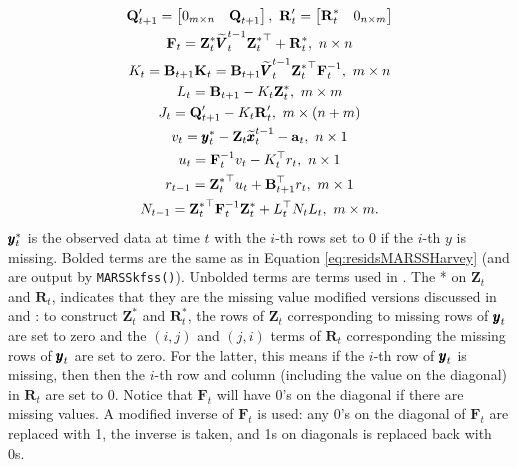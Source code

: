 \documentclass[]{article}
\def\UPS{\mbox{\boldmath $\Upsilon$}}
\def\XI{\mbox{\boldmath $\Xi$}}
\def\BB{\mbox{$\mathbf B$}}	\def\bb{\mbox{$\mathbf b$}} \def\Bb{\mbox{$\mathbf J$}} \def\Ba{\mbox{$\mathbf L$}} \def\Bm{\UPS}
\def\FF{\mbox{$\mathbf F$}} \def\ff{\mbox{$\mathbf f$}}
\def\KK{\mbox{$\mathbf K$}}
\def\QQ{\mbox{$\mathbf Q$}}	 \def\qq{\mbox{$\mathbf q$}} \def\Qb{\mbox{$\mathbf G$}}  \def\Qm{\mathbb{Q}}
\def\RR{\mbox{$\mathbf R$}}	 \def\rr{\mbox{$\mathbf r$}} \def\Rb{\mbox{$\mathbf H$}}	\def\Rm{\mathbb{R}}
\def\VV{\mbox{$\pmb{V}$}}	\def\vv{\mbox{$\pmb{v}$}}
\def\ZZ{\mbox{$\mathbf Z$}}	\def\zz{\mbox{$\mathbf z$}}	\def\Zb{\mbox{$\mathbf M$}} \def\Za{\mbox{$\mathbf N$}} \def\Zm{\XI}
\def\hatxttm{\widetilde{\xx}_t^{t-1}}
\def\hatVttm{\widetilde{\VV}_t^{t-1}}
\begin{document}
\begin{equation}\label{eq:Harveyalgo}
\begin{gathered}
\QQ^\prime_{t+1}=\begin{bmatrix}0_{m \times n}&\QQ_{t+1}\end{bmatrix}, \mbox{    } \RR^\prime_t=\begin{bmatrix}\RR_t^* & 0_{n \times m}\end{bmatrix}\\
\FF_t = \ZZ_t^*\hatVttm{\ZZ_t^*}^\top+\RR_t^* , \,\, n \times n \\
K_t = \BB_{t+1}\KK_t = \BB_{t+1} \hatVttm{\ZZ_t^*}^\top \FF_t^{-1}  , \,\, m \times n  \\
L_t = \BB_{t+1} - K_t\ZZ_t^*  , \,\, m \times m \\
J_t= \QQ^\prime_{t+1} - K_t \RR^\prime_t  , \,\, m \times (n+m) \\
v_t = \yy_t^* - \ZZ_t\hatxttm - \aa_t , \,\, n \times 1 \\
u_t = \FF_t^{-1} v_t - K_t^\top r_t , \,\, n \times 1 \\
r_{t-1} = {\ZZ_t^*}^\top u_t + \BB_{t+1}^\top r_t , \,\, m \times 1  \\
N_{t-1} = {\ZZ_t^*}^\top \FF_t^{-1} \ZZ_t^* + L_t^\top N_t L_t   , \,\, m \times m .
\end{gathered}
\end{equation}
$\mbox{$\pmb{y}$}_t^*$ is the observed data at time $t$ with the $i$-th rows set to 0 if the $i$-th $y$ is missing. 
Bolded terms are the same as in Equation \ref{eq:residsMARSSHarvey} (and are output by \texttt{MARSSkfss()}).  Unbolded terms are terms used in \citet{Harveyetal1998}.  The * on $\ZZ_t$ and $\RR_t$, indicates that they are the missing value modified versions  discussed in \citet[section 6.4]{ShumwayStoffer2006} and \citet{Holmes2010}: to construct $\ZZ_t^*$ and $\RR_t^*$, the rows of $\ZZ_t$ corresponding to missing rows of $\mbox{$\pmb{y}$}_t$ are set to zero and the $(i,j)$ and $(j,i)$ terms of $\RR_t$ corresponding the missing rows of $\mbox{$\pmb{y}$}_t$ are set to zero.  For the latter, this means if the $i$-th row of $\mbox{$\pmb{y}$}_t$ is missing, then then the $i$-th row and column (including the value on the diagonal) in $\RR_t$ are set to 0. Notice that $\FF_t$ will have 0's on the diagonal if there are missing values. A modified inverse of $\FF_t$ is used: any 0's on the diagonal of $\FF_t$ are replaced with 1, the inverse is taken, and 1s on diagonals is replaced back with 0s.
\end{document}
